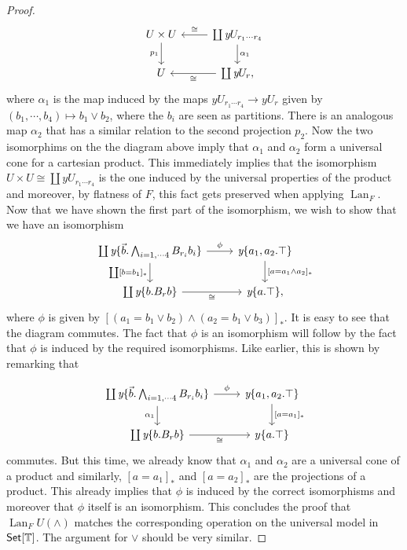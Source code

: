 \documentclass[a4paper]{amsproc}
\theoremstyle{plain}
\theoremstyle{definition}
\theoremstyle{remark}
\numberwithin{equation}{section}
\newcommand{\y}{\textit{y}}
\DeclareMathOperator{\Lan}{Lan}
\newcommand{\Set}{\textup{\textsf{Set}}}
\begin{document}
\begin{proof}
\[
\begin{tikzcd}
U \times U \arrow[d, "p_1"'] & \coprod \y U_{r_1 \cdots r_4} \arrow[d, "\alpha_1"] \arrow[l, "\cong"'] \\
U                            & \coprod \y U_r \arrow[l, "\cong"]                                    ,
\end{tikzcd}
\]
where $\alpha_1$ is the map induced by the maps $\y U_{r_1 \cdots r_4} \to \y U_r$ given by $(b_1,\cdots,b_4) \mapsto b_1 \vee b_2$, where the $b_i$ are seen as partitions. There is an analogous map $\alpha_2$ that has a similar relation to the second projection $p_2$. Now the two isomorphims on the the diagram above imply that $\alpha_1$ and $\alpha_2$ form a universal cone for a cartesian product. This immediately implies that the isomorphism $U \times U \cong \coprod \y U_{r_1 \cdots r_4}$ is the one induced by the universal properties of the product and moreover, by flatness of $F$, this fact gets preserved when applying $\Lan_F$. Now that we have shown the first part of the isomorphism, we wish to show that we have an isomorphism
\[
\begin{tikzcd}
{\coprod \y \{\vec{b}.\bigwedge_{i=1,\cdots 4} B_{r_i} b_i\}} \arrow[d, "{\coprod [b = b_1]_*}"'] \arrow[r, "\phi"] & {\y \{a_1,a_2.\top\}} \arrow[d, "{[a = a_1 \wedge a_2]_*}"] \\
\coprod \y \{b.B_rb\} \arrow[r, "\cong"']                                                & \y\{a.\top\}                                               ,
\end{tikzcd}
\]
where $\phi$ is given by $[(a_1 = b_1 \vee b_2) \wedge (a_2 = b_1 \vee b_3)]_*$. It is easy to see that the diagram commutes. The fact that $\phi$ is an isomorphism will follow by the fact that $\phi$ is induced by the required isomorphisms. Like earlier, this is shown by remarking that

\[
\begin{tikzcd}
{\coprod \y \{\vec{b}.\bigwedge_{i=1,\cdots 4} B_{r_i} b_i\}} \arrow[d, "\alpha_1"'] \arrow[r, "\phi"] & {\y \{a_1,a_2.\top\}} \arrow[d, "{[a = a_1]_*}"] \\
\coprod \y \{b.B_rb\} \arrow[r, "\cong"']                                                            & y\{a.\top\}
\end{tikzcd}
\]
commutes. But this time, we already know that $\alpha_1$ and $\alpha_2$ are a universal cone of a product and similarly, $[a=a_1]_*$ and $[a=a_2]_*$ are the projections of a product. This already implies that $\phi$ is induced by the correct isomorphisms and moreover that $\phi$ itself is an isomorphism. This concludes the proof that $\Lan_F U(\wedge)$ matches the corresponding operation on the universal model in $\Set[\mathbb{T}]$. The argument for $\vee$ should be very similar.


\end{proof}
\end{document}
